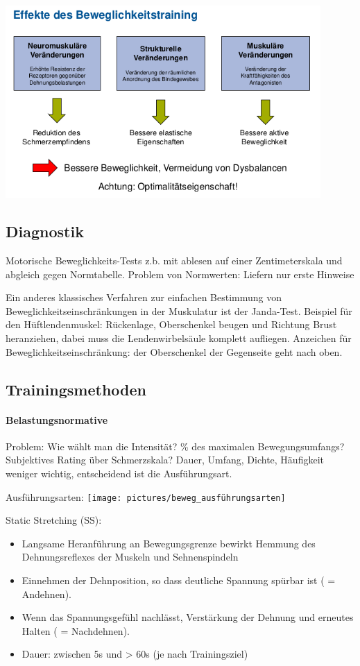 \includegraphics[width=0.9\textwidth]{pictures/beweg_effekte}

\subsection{Diagnostik}

Motorische Beweglichkeits-Tests z.b. mit ablesen auf einer Zentimeterskala und abgleich gegen Normtabelle. Problem von Normwerten: Liefern nur erste Hinweise

Ein anderes klassisches Verfahren zur einfachen Bestimmung von Beweglichkeitseinschränkungen in der Muskulatur  ist der Janda-Test.
Beispiel für den Hüftlendenmuskel: Rückenlage, Oberschenkel beugen und Richtung Brust heranziehen, dabei muss die Lendenwirbelsäule komplett aufliegen.
Anzeichen für Beweglichkeitseinschränkung: der Oberschenkel der Gegenseite geht nach oben.

\subsection{Trainingsmethoden}

\paragraph*{Belastungsnormative}
Problem: Wie wählt man die Intensität? \% des maximalen Bewegungsumfangs? Subjektives Rating über Schmerzskala?
Dauer, Umfang, Dichte, Häufigkeit weniger wichtig, entscheidend ist die Ausführungsart.

Ausführungsarten:
\texttt{[image: pictures/beweg\_ausführungsarten]}

Static Stretching (SS):
\begin{itemize}
    \item Langsame Heranführung an Bewegungsgrenze bewirkt Hemmung des Dehnungsreflexes der Muskeln und Sehnenspindeln
    \item Einnehmen der Dehnposition, so dass deutliche
    Spannung spürbar ist ( = Andehnen).
    \item Wenn das Spannungsgefühl nachlässt, Verstärkung der Dehnung und erneutes Halten ( = Nachdehnen).
    \item Dauer: zwischen 5s und > 60s (je nach Trainingsziel)
\end{itemize}

